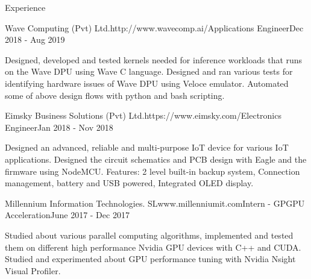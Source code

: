 \documentclass[
	11pt, %
]{./../assets/resume} %
\begin{document}
\begin{rSection}{Experience}
	\pagebreak
    
	\begin{rSubsectionX}{Wave Computing (Pvt) Ltd.}{http://www.wavecomp.ai/}{Applications Engineer}{Dec 2018 - Aug 2019}
        \item Designed, developed and tested kernels needed for inference workloads that runs on the Wave DPU using Wave C language. Designed and ran various tests for identifying hardware issues of Wave DPU using Veloce emulator. Automated some of above design flows with python and bash scripting.
	\end{rSubsectionX}

	\begin{rSubsectionX}{Eimsky Business Solutions (Pvt) Ltd.}{https://www.eimsky.com/}{Electronics Engineer}{Jan 2018 - Nov 2018}
        \item Designed an advanced, reliable and multi-purpose IoT device for various IoT applications. Designed the circuit schematics and PCB design with Eagle and the firmware using NodeMCU. Features: 2 level built-in backup system, Connection management, battery and USB powered, Integrated OLED display.
	\end{rSubsectionX}

 	\begin{rSubsectionX}{Millennium Information Technologies. SL}{www.millenniumit.com}{Intern - GPGPU Acceleration}{June 2017 - Dec 2017}
        \item Studied about various parallel computing algorithms, implemented and tested them on different high performance Nvidia GPU devices with C++ and CUDA. Studied and experimented about GPU performance tuning with Nvidia Nsight Visual Profiler.
	\end{rSubsectionX}
\end{rSection}

\end{document}
